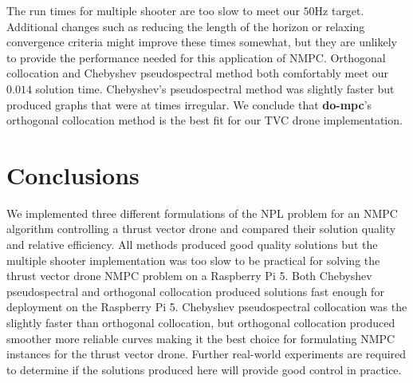 \documentclass[]{article}
\newcommand{\dompc}{{\bf do-mpc}}
\begin{document}
 The run times for multiple shooter are too slow to meet our  $50$Hz target.  Additional changes such as reducing the length of the horizon or relaxing convergence criteria might improve these times somewhat, but they are unlikely to provide the performance needed for this application of NMPC.  Orthogonal collocation and  Chebyshev pseudospectral method both comfortably  meet our $0.014$ solution time. Chebyshev's pseudospectral method was slightly faster but produced graphs that were at times irregular.  We conclude that {\dompc}'s orthogonal collocation method is the best fit for our TVC drone implementation.

\section*{Conclusions}
We implemented three different formulations of the NPL problem for an NMPC algorithm controlling a thrust vector drone and compared their solution quality and relative efficiency. All methods produced good quality solutions but the multiple shooter implementation was too slow to be practical for solving the thrust vector drone NMPC problem on a Raspberry Pi 5. Both Chebyshev pseudospectral and orthogonal collocation produced solutions fast enough for deployment on the Raspberry Pi 5. Chebyshev pseudospectral collocation was the slightly faster than orthogonal collocation, but orthogonal collocation produced smoother more reliable curves making it the best choice for formulating NMPC instances for the thrust vector drone.  Further real-world experiments are required to determine if the solutions produced here will provide good control in practice.
	
	
%	


\end{document}

